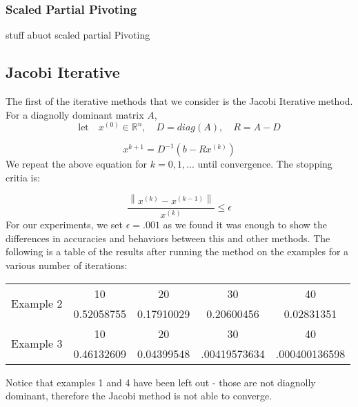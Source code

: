 \documentclass[11pt]{article}	%
\newcommand\norm[1]{\left\lVert#1\right\rVert}
\begin{document}
    \subsubsection{Scaled Partial Pivoting}
    stuff abuot scaled partial Pivoting


\subsection{Jacobi Iterative}
    The first of the iterative methods that we consider is the Jacobi Iterative method. For a diagnolly dominant matrix $A$,
    \begin{equation}\label{eq:jacobi-eq-1-qualifier}
        \textrm{let} \quad x^{(0)}\in {\mathbb R}^n,\quad D = diag(A),\quad R = A - D
    \end{equation}

    \begin{equation}\label{eq:jacobi-eq-1}
        x^{k+1} = D^{-1}(b- Rx^{(k)})
    \end{equation}
    We repeat the above equation for $k = 0, 1, ...$ until convergence. The stopping critia is:

    \begin{equation}
        \frac{\norm{x^{(k)} - x^{(k-1)}}}{x^{(k)}} \leq \epsilon
    \end{equation}
    For our experiments, we set $\epsilon = .001$ as we found it was enough to show the differences in accuracies and behaviors between this and other methods. The following is a table of the results after running the method on the examples for a various number of iterations:
    \begin{center}
        \begin{tabular}{||c|c|c|c|c||}
            \hline
            \multirow{2}{5em}{Example 2} & 10 & 20 & 30 & 40 \\ [.25em]
            & 0.52058755 & 0.17910029 & 0.20600456 & 0.02831351 \\ [.25em]
            \hline \hline
            \multirow{2}{5em}{Example 3} & 10 & 20 & 30 & 40 \\ [.25em]
            & 0.46132609 & 0.04399548 & .00419573634 & .000400136598 \\ [.25em]
            \hline
        \end{tabular}
    \end{center}

    Notice that examples 1 and 4 have been left out - those are not diagnolly dominant, therefore the Jacobi method
    is not able to converge.
\end{document}
